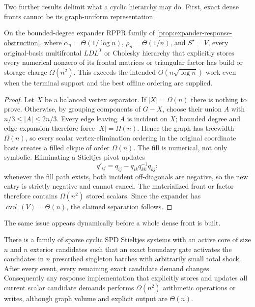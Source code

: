 Two further results delimit what a cyclic hierarchy may do.  First, exact
dense fronts cannot be its graph-uniform representation.

\begin{proposition}
\label{prop:explicit-multifrontal-expander}
On the bounded-degree expander RPPR family of
\cref{prop:expander-response-obstruction}, where
$\alpha_n=\Theta(1/\log n)$, $\rho_n=\Theta(1/n)$, and $S^\star=V$, every
original-basis multifrontal $LDL^T$ or Cholesky hierarchy that explicitly
stores every numerical nonzero of its frontal matrices or triangular factor
has build or storage charge $\Omega(n^2)$.  This exceeds the intended
$\widetilde O(n\sqrt{\log n})$ work even when the terminal support and the
best offline ordering are supplied.
\end{proposition}

\begin{proof}
Let $X$ be a balanced vertex separator.  If $|X|=\Omega(n)$ there is nothing
to prove.  Otherwise, by grouping components of $G-X$, choose their union
$A$ with $n/3\leq|A|\leq2n/3$.  Every edge leaving $A$ is incident on $X$;
bounded degree and edge expansion therefore force $|X|=\Omega(n)$.  Hence
the graph has treewidth $\Omega(n)$, so every scalar vertex-elimination
ordering in the original coordinate basis creates a filled clique of order
$\Omega(n)$.
The fill is numerical, not only symbolic.  Eliminating a Stieltjes pivot
updates
\begin{equation}
 q'_{ij}=q_{ij}-q_{ik}q_{kk}^{-1}q_{kj};
 \label{eq:stieltjes-strict-fill}
\end{equation}
whenever the fill path exists, both incident off-diagonals are negative, so
the new entry is strictly negative and cannot cancel.  The materialized
front or factor therefore contains $\Omega(n^2)$ stored scalars.  Since the
expander has
$\operatorname{cvol}(V)=\Theta(n)$, the claimed separation follows.
\end{proof}

The same issue appears dynamically before a whole dense front is built.

\begin{proposition}
\label{prop:explicit-demand-light-cascade}
There is a family of sparse cyclic SPD Stieltjes systems with an active core
of size $n$ and $n$ exterior candidates such that an exact boundary gate
activates the candidates in $n$ prescribed singleton batches with
arbitrarily small total shock.  After every event, every remaining exact
candidate demand changes.  Consequently any response implementation that
explicitly stores and updates all current scalar candidate demands performs
$\Omega(n^2)$ arithmetic operations or writes, although graph volume and
explicit output are $\Theta(n)$.
\end{proposition}

